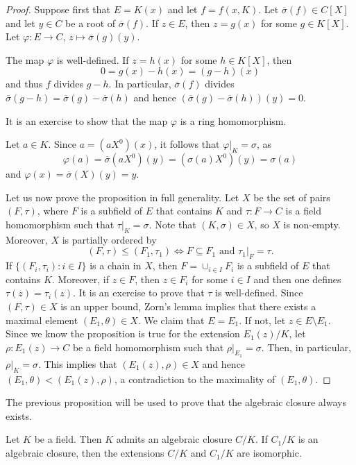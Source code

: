\begin{proof}
	Suppose first that $E=K(x)$ and let $f=f(x,K)$. Let $\overline{\sigma}(f)\in C[X]$ 
	and let $y\in C$ be a root of $\overline{\sigma}(f)$. If $z\in E$, then $z=g(x)$ for
	some $g\in K[X]$. Let $\varphi\colon E\to C$, $z\mapsto \overline{\sigma}(g)(y)$. 

	The map $\varphi$ is well-defined. If $z=h(x)$ for some $h\in K[X]$, then
	\[
	0=g(x)-h(x)=(g-h)(x)
	\]
	and thus $f$ divides $g-h$. In particular, $\overline{\sigma}(f)$ divides
    $\overline{\sigma}(g-h)=\overline{\sigma}(g)-\overline{\sigma}(h)$ and hence
    $(\overline{\sigma}(g)-\overline{\sigma}(h))(y)=0$. 

	It is an exercise to show that the map $\varphi$ is a ring homomorphism.
	
	Let $a\in K$. Since $a=(aX^0)(x)$, it follows that $\varphi|_K=\sigma$, as 
	\[
	\varphi(a)=\overline{\sigma}(aX^0)(y)=(\sigma(a)X^0)(y)=\sigma(a)
	\]
	and 
	$\varphi(x)=\overline{\sigma}(X)(y)=y$. 
	
	Let us now prove the proposition in full generality. Let 
	$X$ be the set of pairs $(F,\tau)$, where $F$ is a subfield of $E$ that contains $K$ and
	$\tau\colon F\to C$ is a field homomorphism such that $\tau|_K=\sigma$. Note that
	$(K,\sigma)\in X$, so $X$ is non-empty. Moreover, $X$ is partially ordered by
	\[
	(F,\tau)\leq (F_1,\tau_1)\Longleftrightarrow F\subseteq F_1\text{ and }\tau_1|_F=\tau.
	\]
	If $\{(F_i,\tau_i):i\in I\}$ is a chain in $X$, then $F=\cup_{i\in I}F_i$ is a subfield of $E$
	that contains $K$. Moreover, if $z\in F$, then $z\in F_i$ for some $i\in I$ and 
	then one defines $\tau(z)=\tau_i(z)$. It is an exercise to prove that $\tau$ is well-defined.
	Since $(F,\tau)\in X$ is an upper bound, Zorn's lemma implies that there exists
	a maximal element 
	$(E_1,\theta)\in X$. We claim that $E=E_1$. If not, let $z\in E\setminus E_1$. 
	Since we know the proposition is true for the extension $E_1(z)/K$, 
	let  
	$\rho\colon E_1(z)\to C$ be a field homomorphism such that $\rho|_{E_1}=\sigma$. Then, in particular, 
	$\rho|_K=\sigma$. This implies that $(E_1(z),\rho)\in X$ and hence
	$(E_1,\theta)<(E_1(z),\rho)$, a contradiction to the maximality of $(E_1,\theta)$. 
\end{proof}

The previous proposition will be used to prove 
that the algebraic closure always exists. 

\begin{theorem}[Artin]
	Let $K$ be a field. Then $K$ admits an algebraic closure $C/K$. If $C_1/K$
	is an algebraic closure, then the extensions $C/K$ and $C_1/K$ are
	isomorphic. 
\end{theorem}

